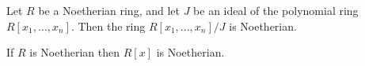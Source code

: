 \documentclass[12pt, a4paper, oneside, openright, titlepage]{book}
\begin{document}
\begin{thm}
    Let $R$ be a Noetherian ring, and let $J$ be an ideal of the polynomial ring $R[x_1,...,x_n]$. Then the ring $R[x_1,...,x_n]/J$ is Noetherian.
\end{thm}

\begin{lem}
    If $R$ is Noetherian then $R[x]$ is Noetherian.
\end{lem}



\begin{appendices}
	

\end{appendices}
\end{document}
